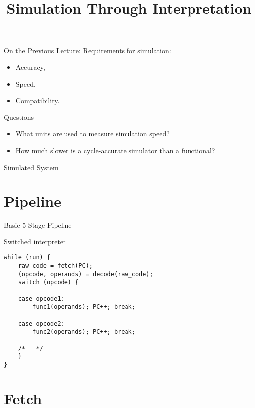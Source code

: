 

\title{Simulation Through Interpretation}



\startslides

\begin{frame}{On the Previous Lecture:}
Requirements for simulation:
\begin{itemize}
\item Accuracy,
\item Speed,
\item Compatibility.
\end{itemize}
\end{frame}

\begin{frame}{Questions}
\begin{itemize}
\item What units are used to measure simulation speed?\pause
\item How much slower is a cycle-accurate simulator than a functional?
\end{itemize}
\end{frame}

\begin{frame}{Simulated System}
\centering
\vfill
{}
\vfill
\end{frame}

\section{Pipeline}

\begin{frame}{Basic 5-Stage Pipeline}
\centering
{}
\end{frame}

\begin{frame}[fragile]{Switched interpreter}
\begin{lstlisting}
while (run) {
    raw_code = fetch(PC);
    (opcode, operands) = decode(raw_code);
    switch (opcode) {

    case opcode1:
        func1(operands); PC++; break;

    case opcode2:
        func2(operands); PC++; break;

    /*...*/
    }
}
\end{lstlisting}
\end{frame}

\section{Fetch}


